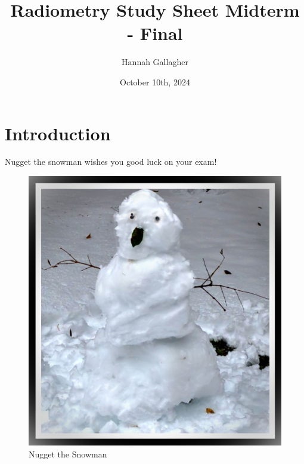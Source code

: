 \documentclass{article}
\title{Radiometry Study Sheet Midterm - Final}
\author{Hannah Gallagher}
\date{October 10th, 2024}
\begin{document}
\maketitle

\section{Introduction}




Nugget the snowman wishes you good luck on your exam!

\begin{figure}[h!]
\centering
\includegraphics[scale=1]{Nugget.jpg}
\caption{Nugget the Snowman}
\label{fig:Nugget}
\end{figure}
\end{document}
